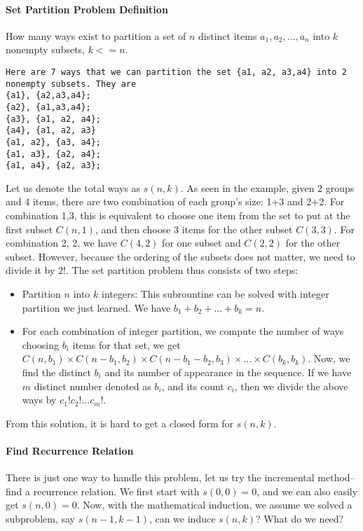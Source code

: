 \documentclass[../main.tex]{subfiles}
\begin{document}
\paragraph{Set Partition Problem Definition} How many ways exist to partition a set of $n$ distinct items ${a_1, a_2, ..., a_n}$ into $k$ nonempty subsets, $k<=n$.
\begin{lstlisting}[numbers=none]
Here are 7 ways that we can partition the set {a1, a2, a3,a4} into 2 nonempty subsets. They are
{a1}, {a2,a3,a4}; 
{a2}, {a1,a3,a4}; 
{a3}, {a1, a2, a4};  
{a4}, {a1, a2, a3}
{a1, a2}, {a3, a4}; 
{a1, a3}, {a2, a4}; 
{a1, a4}, {a2, a3};
\end{lstlisting}
Let us denote the total ways as $s(n,k)$. As seen in the example, given 2 groups and 4 items, there are two combination of each group's size: 1+3 and 2+2. For combination {1,3}, this is equivalent to choose one item from the set to put at the first subset $C(n,1)$, and then choose 3  items for the other subset $C(3, 3)$. For combination {2, 2}, we have $C(4,2)$ for one subset and $C(2,2)$ for the other subset. However, because the ordering of the subsets does not matter, we need to divide it by $2!$. The set partition problem thus consists of two steps:
\begin{itemize}
    \item Partition $n$ into $k$ integers: This subrountine can be solved with integer partition we just learned. We have $b_1+b_2+...+b_k = n$.
    \item For each combination of integer partition, we compute the number of ways choosing  $b_i$ items for that set, we get $C(n, b_1)\times C(n-b_1, b_2)\times C(n-b_1-b_2, b_3)\times...\times C(b_k, b_k)$. Now, we find the distinct $b_i$ and its number of appearance in the sequence. If we have $m$ distinct number denoted as $b_i$, and its  count $c_i$, then we divide the above ways by $c_1!c_2!...c_m!$.
\end{itemize}

From this solution, it is hard to get a closed form for $s(n,k)$.





\paragraph{Find Recurrence Relation} There is just one way to handle this problem, let us try the incremental method--find a recurrence relation. We first start with $s(0, 0)=0$, and we can also easily get $s(n,0)=0$. Now, with the mathematical induction, we assume we solved a subproblem, say $s(n-1, k-1)$, can we induce $s(n,k)$? What do we need? 
\end{document}
